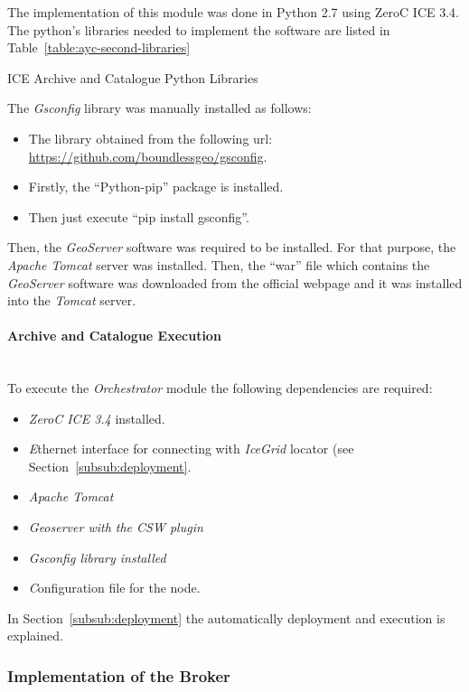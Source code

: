 The implementation of this module was done in Python 2.7 using ZeroC ICE 3.4. The
python's libraries needed to implement the software are listed in
Table~\ref{table:ayc-second-libraries}

\begin{table}[hp]
  \centering
  {\small
  
  }
  \caption{ICE Archive and Catalogue Python Libraries}
  \label{table:ayc-second-libraries}
\end{table}

The \emph{Gsconfig} library was manually installed as follows:
\begin{itemize}
\item The library obtained from the following url: \url{https://github.com/boundlessgeo/gsconfig}.
\item Firstly, the ``Python-pip''  package is installed.
\item Then just execute ``pip install gsconfig''.
\end{itemize}

Then, the \emph{GeoServer} software was required to be installed. For that purpose, the
\emph{Apache Tomcat} server was installed. Then, the ``war''
file which contains the \emph{GeoServer} software was downloaded from the official webpage and
it was installed into the \emph{Tomcat} server.

\paragraph{Archive and Catalogue Execution}~\\

To execute the \emph{Orchestrator} module the following dependencies
are required:
\begin{itemize}
\item \emph{ZeroC ICE 3.4} installed.
\item \emph Ethernet interface for connecting with \emph{IceGrid} locator (see
  Section~\ref{subsub:deployment}.
\item \emph{Apache Tomcat}
\item \emph{Geoserver with the \ac{CSW} plugin}
\item \emph{Gsconfig library installed}
\item \emph Configuration file for the node.
\end{itemize}
 In Section~\ref{subsub:deployment} the
  automatically deployment and execution is explained. 

\subsubsection{Implementation of the Broker}




